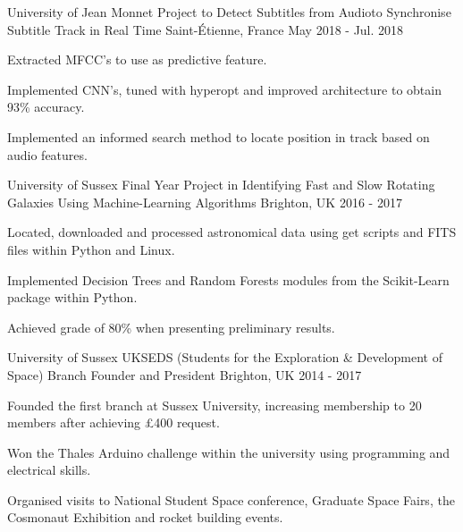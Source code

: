 \begin{cventries}
	\cventry
	{University of Jean Monnet}
	{Project to Detect Subtitles from Audioto Synchronise Subtitle Track in Real Time}
	{Saint-\'{E}tienne, France}
	{May 2018 - Jul. 2018}
	{
		\begin{cvitems}
			\item {Extracted MFCC's to use as predictive feature.}
			\item {Implemented CNN's, tuned with hyperopt and improved architecture to obtain 93\% accuracy.}
			\item {Implemented an informed search method to locate position in track based on audio features.}
		\end{cvitems}
	}
  \cventry
    {University of Sussex}
    {Final Year Project in Identifying Fast and Slow Rotating Galaxies Using Machine-Learning Algorithms}
    {Brighton, UK}
    {2016 - 2017}
    {
      \begin{cvitems}
        \item {Located, downloaded and processed astronomical data using get scripts and FITS files within Python and Linux.}
        \item {Implemented Decision Trees and Random Forests modules from the Scikit-Learn package within Python.}
        \item {Achieved grade of 80\% when presenting preliminary results.}
      \end{cvitems}
    }
  \cventry
    {University of Sussex}
    {UKSEDS (Students for the Exploration \& Development of Space) Branch Founder and President}
    {Brighton, UK}
    {2014 - 2017}
    {
      \begin{cvitems}
        \item {Founded the first branch at Sussex University, increasing membership to 20 members after achieving £400 request.}
        \item {Won the Thales Arduino challenge within the university using programming and electrical skills.}
        \item {Organised visits to National Student Space conference, Graduate Space Fairs, the Cosmonaut Exhibition and rocket building events.}
      \end{cvitems}
    }
\end{cventries}
